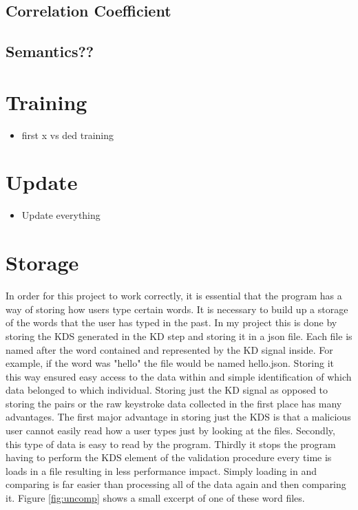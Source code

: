 \documentclass[10pt,a4paper]{report}
\begin{document}
\subsection{Correlation Coefficient}
\subsection{Semantics??}
\section{Training}
\begin{itemize}
	\item first x vs ded training
\end{itemize}
\section{Update}
\begin{itemize}
	\item Update everything
\end{itemize}
\section{Storage}

In order for this project to work correctly, it is essential that the program has a way of storing how users type certain words. It is necessary to build up a storage of the words that the user has typed in the past. In my project this is done by storing the KDS generated in the KD step and storing it in a json file. Each file is named after the word contained and represented by the KD signal inside. For example, if the word was "hello" the file would be named hello.json. Storing it this way ensured easy access to the data within and simple identification of which data belonged to which individual. Storing just the KD signal as opposed to storing the pairs or the raw keystroke data collected in the first place has many advantages. The first major advantage in storing just the KDS is that a malicious user cannot easily read how a user types just by looking at the files. Secondly, this type of data is easy to read by the program. Thirdly it stops the program having to perform the KDS element of the validation procedure every time is loads in a file resulting in less performance impact. Simply loading in and comparing is far easier than processing all of the data again and then comparing it. Figure \ref{fig:uncomp} shows a small excerpt of one of these word files.
\end{document}
